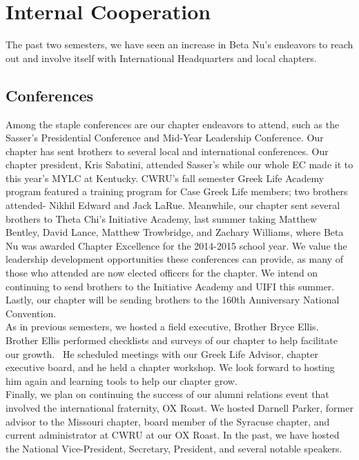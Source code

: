 \chapter{Internal Cooperation}
  The past two semesters, we have seen an increase in Beta Nu’s endeavors to reach out and involve itself with International Headquarters and local chapters. 
  
  \section*{Conferences}
  
    Among the staple conferences are our chapter endeavors to attend, such as the Sasser's Presidential Conference and Mid-Year Leadership Conference. Our chapter has sent brothers to several local and international conferences. Our chapter president, Kris Sabatini, attended Sasser's while our whole EC made it to this year's MYLC at Kentucky. CWRU's fall semester Greek Life Academy program featured a training program for Case Greek Life members; two brothers attended- Nikhil Edward and Jack LaRue. Meanwhile, our chapter sent several brothers to Theta Chi's Initiative Academy, last summer taking Matthew Bentley, David Lance, Matthew Trowbridge, and Zachary Williams, where Beta Nu was awarded Chapter Excellence for the 2014-2015 school year. We value the leadership development opportunities these conferences can provide, as many of those who attended are now elected officers for the chapter. We intend on continuing to send brothers to the Initiative Academy and UIFI this summer. Lastly, our chapter will be sending brothers to the 160th Anniversary National Convention. \\
    
    As in previous semesters, we hosted a field executive, Brother Bryce Ellis. Brother Ellis performed checklists and surveys of our chapter to help facilitate our growth.  He scheduled meetings with our Greek Life Advisor, chapter executive board, and he held a chapter workshop. We look forward to hosting him again and learning tools to help our chapter grow. \\
    
    Finally, we plan on continuing the success of our alumni relations event that involved the international fraternity, OX Roast. We hosted Darnell Parker, former advisor to the Missouri chapter, board member of the Syracuse chapter, and current administrator at CWRU at our OX Roast. In the past, we have hosted the National Vice-President, Secretary, President, and several notable speakers. 
    
